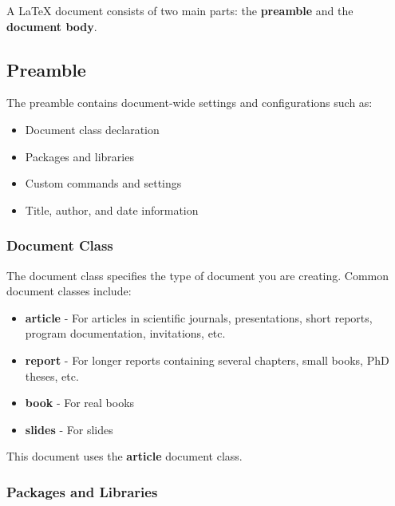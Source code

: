 \documentclass[12pt]{article}
\begin{document}
  A LaTeX document consists of two main parts: the \textbf{preamble} and the \textbf{document body}. 


  \subsection{Preamble}
  \label{sec:preamble}

  The preamble contains document-wide settings and configurations such as:

  \begin{itemize}
    \item Document class declaration
    \item Packages and libraries
    \item Custom commands and settings
    \item Title, author, and date information
  \end{itemize}


  \subsubsection{Document Class}
  \label{sec:document-class}

  The document class specifies the type of document you are creating. Common document classes include:  

  \begin{itemize}
    \item \textbf{article} - For articles in scientific journals, presentations, short reports, program documentation, invitations, etc.
    \item \textbf{report} - For longer reports containing several chapters, small books, PhD theses, etc.
    \item \textbf{book} - For real books
    \item \textbf{slides} - For slides
  \end{itemize}

  This document uses the \textbf{article} document class.

 
  \subsubsection{Packages and Libraries}
  \label{sec:packages-and-libraries}
\end{document}
